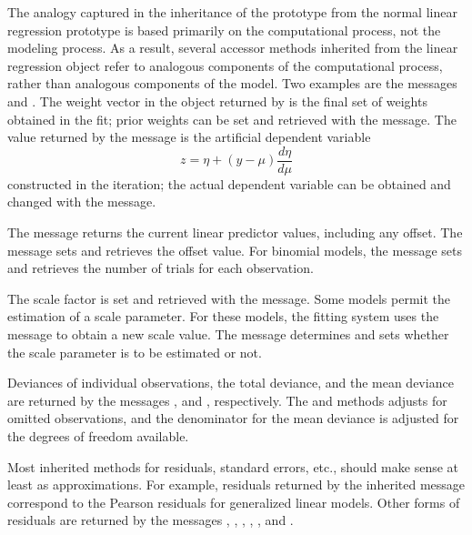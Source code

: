 The analogy captured in the inheritance of the 
prototype from the normal linear regression prototype is based
primarily on the computational process, not the modeling process. As a
result, several accessor methods inherited from the linear regression
object refer to analogous components of the computational process,
rather than analogous components of the model. Two examples are the
messages  and . The weight vector in the
object returned by  is the final set of weights
obtained in the fit; prior weights can be set and retrieved with the
 message. The value returned by the 
message is the artificial dependent variable
\begin{displaymath}
z = \eta + (y - \mu) \frac{d\eta}{d\mu}
\end{displaymath}
constructed in the iteration; the actual dependent variable can be
obtained and changed with the  message.

The message  returns the current linear predictor values,
including any offset. The  message sets and retrieves
the offset value. For binomial models, the  message
sets and retrieves the number of trials for each observation.

The scale factor is set and retrieved with the  message.
Some models permit the estimation of a scale parameter. For these
models, the fitting system uses the  message to
obtain a new scale value. The message 
determines and sets whether the scale parameter is to be estimated or
not.

Deviances of individual observations, the total deviance, and the mean
deviance are returned by the messages ,
 and , respectively. The
 and  methods adjusts for
omitted observations, and the denominator for the mean deviance is
adjusted for the degrees of freedom available.

Most inherited methods for residuals, standard errors, etc., should
make sense at least as approximations. For example, residuals returned
by the inherited  message correspond to the Pearson
residuals for generalized linear models. Other forms of residuals are
returned by the messages ,
, ,
, , and
.

